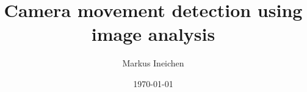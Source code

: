 \documentclass[11pt,a4paper]{scrreprt}
\begin{document}
	\setlength\parindent{0pt} 
	
	\titlehead{MID SWEDEN UNIVERSITY \\ 
		Information and Communication Systems}
	\subject{Rough concept}
	\title{Camera movement detection using image analysis}
	\author{Markus Ineichen }
	\date{\today}
	
	\maketitle
	
	\renewcommand{\contentsname}{Contents}
	\tableofcontents

	
	
\end{document}
